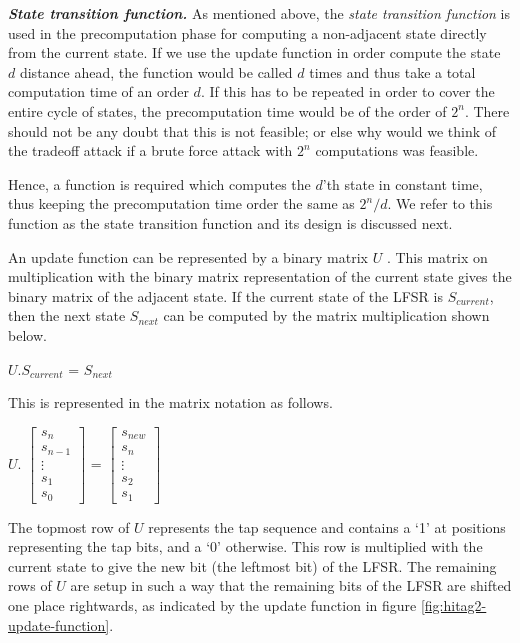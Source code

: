 \noindent \textit{\textbf{State transition function.}} As mentioned above, the \emph{state transition function} is used in the precomputation phase for computing a non-adjacent state directly from the current state. If we use the update function in order compute the state $d$ distance ahead, the function would be called $d$ times and thus take a total computation time of an order $d$. If this has to be repeated in order to cover the entire cycle of states, the precomputation time would be of the order of $2^n$. There should not be any doubt that this is not feasible; or else why would we think of the tradeoff attack if a brute force attack with $2^n$ computations was feasible. 

Hence, a function is required which computes the $d$'th state in constant time, thus keeping the precomputation time order the same as $2^{n}/d$. We refer to this function as the state transition function and its design is discussed next. 

An update function can be represented by a binary matrix $U$ \cite{trappe2005icc}. This matrix on multiplication with the binary matrix representation of the current state gives the binary matrix of the adjacent state. If the current state of the LFSR is $S_{current}$, then the next state $S_{next}$ can be computed by the matrix multiplication shown below.

\begin{center}
$U . S_{current}$ = $S_{next}$\\
\end{center}

This is represented in the matrix notation as follows.

\begin{center}
$U.$
$\begin{bmatrix}
s_{n} \\
s_{n-1} \\
\vdots \\
s_{1} \\
s_{0}
\end{bmatrix}$ = 
$\begin{bmatrix}
s_{new} \\
s_{n} \\
\vdots \\
s_{2} \\
s_{1}
\end{bmatrix}$
\end{center}

The topmost row of $U$ represents the tap sequence and contains a `1' at positions representing the tap bits, and a `0' otherwise. This row is multiplied with the current state to give the new bit (the leftmost bit) of the LFSR. The remaining rows of $U$ are setup in such a way that the remaining bits of the LFSR are shifted one place rightwards, as indicated by the update function in figure \ref{fig:hitag2-update-function}. 

